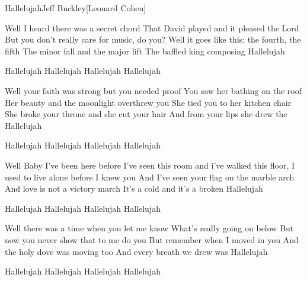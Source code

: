\documentclass[a4paper,11pt,french]{article}
\begin{document}
\begin{Song}{Hallelujah}{Jeff Buckley}[Leonard Cohen]
\begin{multicols}{2}

\begin{Verse}
Well I heard there was a secret chord
That David played and it pleased the Lord
But you don't really care for music, do you?
Well it goes like this: the fourth, the fifth
The minor fall and the major lift
The baffled king composing Hallelujah
\end{Verse}
\espaceInterStrophe

\begin{Chorus}
Hallelujah Hallelujah Hallelujah Hallelujah
\end{Chorus}
\espaceInterStrophe

\begin{Verse}
Well your faith was strong but you needed proof
You saw her bathing on the roof
Her beauty and the moonlight overthrew you
She tied you to her kitchen chair
She broke your throne and she cut your hair
And from your lips she drew the Hallelujah
\end{Verse}
\espaceInterStrophe

\begin{Chorus}
Hallelujah Hallelujah Hallelujah Hallelujah
\end{Chorus}
\espaceInterStrophe

\begin{Verse}
Well Baby I've been here before
I've seen this room and i've walked this floor,
I used to live alone before I knew you
And I've seen your flag on the marble arch
And love is not a victory march
It's a cold and it's a broken Hallelujah
\end{Verse}
\espaceInterStrophe

\begin{Chorus}
Hallelujah Hallelujah Hallelujah Hallelujah
\end{Chorus}
\vfill
\columnbreak

\begin{Verse}
Well there was a time when you let me know
What's really going on below
But now you never show that to me do you
But remember when I moved in you
And the holy dove was moving too
And every breath we drew was Hallelujah
\end{Verse}
\espaceInterStrophe

\begin{Chorus}
Hallelujah Hallelujah Hallelujah Hallelujah
\end{Chorus}
\espaceInterStrophe


\end{multicols}
\end{Song}
\end{document}
